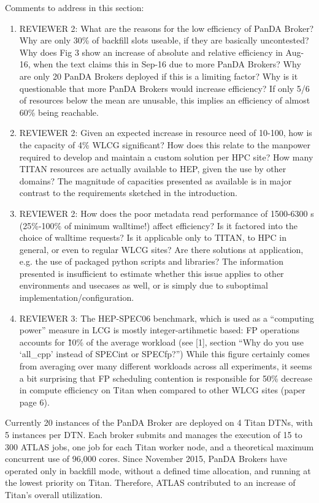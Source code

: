 \ifreview
Comments to address in this section:
\begin{enumerate}
    \color{red} 
    \item REVIEWER 2: What are the reasons for the low efficiency of PanDA
    Broker? Why are only 30\% of backfill slots useable, if they are
    basically uncontested? Why does Fig 3 show an increase of absolute and
    relative efficiency in Aug-16, when the text claims this in Sep-16 due to
    more PanDA Brokers? Why are only 20 PanDA Brokers deployed if this is a
    limiting factor? Why is it questionable that more PanDA Brokers would
    increase efficiency? If only 5/6 of resources below the mean are
    unusable, this implies an efficiency of almost 60\% being reachable.
    \item REVIEWER 2: Given an expected increase in resource need of 10-100,
    how is the capacity of 4\% WLCG significant? How does this relate to the
    manpower required to develop and maintain a custom solution per HPC site?
    How many TITAN resources are actually available to HEP, given the use by
    other domains? The magnitude of capacities presented as available is in
    major contrast to the requirements sketched in the introduction.
    \item REVIEWER 2: How does the poor metadata read performance of
    1500-6300 s (25\%-100\% of minimum walltime!) affect efficiency? Is it
    factored into the choice of walltime requests? Is it applicable only to
    TITAN, to HPC in general, or even to regular WLCG sites? Are there
    solutions at application, e.g. the use of packaged python scripts and
    libraries? The information presented is insufficient to estimate whether
    this issue applies to other environments and usecases as well, or is
    simply due to suboptimal implementation/configuration.
    \item REVIEWER 3: The HEP-SPEC06 benchmark, which is used as a
    ``computing power'' measure in LCG is mostly integer-artihmetic based: FP
    operations accounts for \~10\% of the average workload (see [1], section
    ``Why do you use `all\_cpp' instead of SPECint or SPECfp?'') While this
    figure certainly comes from averaging over many different workloads
    across all experiments, it seems a bit surprising that FP scheduling
    contention is responsible for 50\% decrease in compute efficiency on
    Titan when compared to other WLCG sites (paper page 6).
\end{enumerate}
\fi

Currently 20 instances of the PanDA Broker are deployed on 4 Titan DTNs, with
5 instances per DTN\@. Each broker submits and manages the execution of 15 to
300 ATLAS jobs, one job for each Titan worker node, and a theoretical maximum
concurrent use of 96,000 cores. Since November 2015, PanDA Brokers have
operated only in backfill mode, without a defined time allocation, and
running at the lowest priority on Titan.  Therefore, ATLAS contributed to an
increase of Titan's overall utilization.

